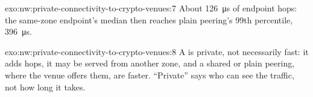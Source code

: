 \begin{solution}{exo:nw:private-connectivity-to-crypto-venues:7}
About \qty{126}{\micro\second} of endpoint hops: the same-zone endpoint's median then reaches plain peering's 99th percentile,
\qty{396}{\micro\second}.
\end{solution}

\begin{solution}{exo:nw:private-connectivity-to-crypto-venues:8}
A  is private, not necessarily fast: it adds hops, it may be served from another zone, and a shared  or plain peering,
where the venue offers them, are faster. ``Private'' says who can see the traffic, not how long it takes.
\end{solution}

